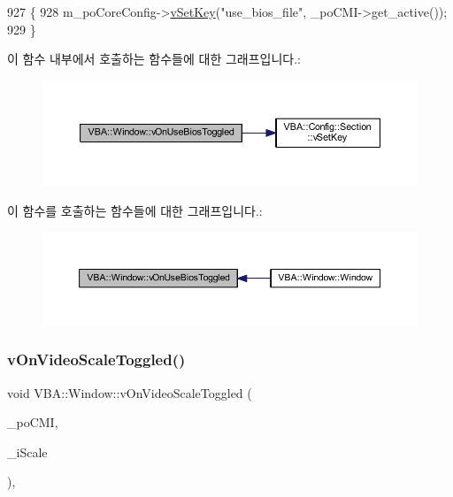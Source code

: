 \begin{DoxyCode}
927 \{
928   m\_poCoreConfig->\mbox{\hyperlink{class_v_b_a_1_1_config_1_1_section_a57e1b95cbea40db71c093381beff4b0e}{vSetKey}}(\textcolor{stringliteral}{"use\_bios\_file"}, \_poCMI->get\_active());
929 \}
\end{DoxyCode}
이 함수 내부에서 호출하는 함수들에 대한 그래프입니다.\+:
\nopagebreak
\begin{figure}[H]
\begin{center}
\leavevmode
\includegraphics[width=350pt]{class_v_b_a_1_1_window_a4c3cba9990c0f7315b49d2c8d338280b_cgraph}
\end{center}
\end{figure}
이 함수를 호출하는 함수들에 대한 그래프입니다.\+:
\nopagebreak
\begin{figure}[H]
\begin{center}
\leavevmode
\includegraphics[width=350pt]{class_v_b_a_1_1_window_a4c3cba9990c0f7315b49d2c8d338280b_icgraph}
\end{center}
\end{figure}
\mbox{\label{class_v_b_a_1_1_window_af0072d4a223c1a543dd5ce0933a72804}} 
\subsubsection{\texorpdfstring{v\+On\+Video\+Scale\+Toggled()}{vOnVideoScaleToggled()}}
{\footnotesize\ttfamily void V\+B\+A\+::\+Window\+::v\+On\+Video\+Scale\+Toggled (\begin{DoxyParamCaption}\item[{Gtk\+::\+Check\+Menu\+Item $\ast$}]{\+\_\+po\+C\+MI,  }\item[{\mbox{\hyperlink{_util_8cpp_a0ef32aa8672df19503a49fab2d0c8071}{int}}}]{\+\_\+i\+Scale }\end{DoxyParamCaption})\hspace{0.3cm}{\ttfamily [protected]}, {\ttfamily [virtual]}}




